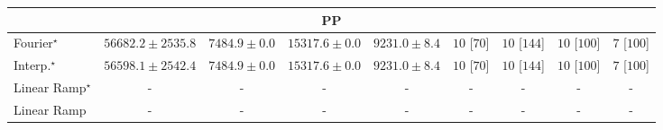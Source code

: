 \begin{tabular}{l|cccc|cccc|}
\cline{1-9}
\multicolumn{9}{c}{\rule{0pt}{8pt}PP} \\
\midrule
Fourier$^\star$ & {\cellcolor[HTML]{004529}} \color[HTML]{F1F1F1} $56682.2\pm 2535.8$ & {\cellcolor[HTML]{FEFFE1}} \color[HTML]{000000} $7484.9\pm 0.0$ & {\cellcolor[HTML]{EDF8B1}} \color[HTML]{000000} $15317.6\pm 0.0$ & {\cellcolor[HTML]{FCFED4}} \color[HTML]{000000} $9231.0\pm 8.4$ & {\cellcolor[HTML]{49006A}} \color[HTML]{F1F1F1} $10$ [$70$] & {\cellcolor[HTML]{49006A}} \color[HTML]{F1F1F1} $10$ [$144$] & {\cellcolor[HTML]{49006A}} \color[HTML]{F1F1F1} $10$ [$100$] & {\cellcolor[HTML]{CD238F}} \color[HTML]{F1F1F1} $7$ [$100$] \\
Interp.$^\star$ & {\cellcolor[HTML]{004529}} \color[HTML]{F1F1F1} $56598.1\pm 2542.4$ & {\cellcolor[HTML]{FEFFE1}} \color[HTML]{000000} $7484.9\pm 0.0$ & {\cellcolor[HTML]{EDF8B1}} \color[HTML]{000000} $15317.6\pm 0.0$ & {\cellcolor[HTML]{FCFED4}} \color[HTML]{000000} $9231.0\pm 8.4$ & {\cellcolor[HTML]{49006A}} \color[HTML]{F1F1F1} $10$ [$70$] & {\cellcolor[HTML]{49006A}} \color[HTML]{F1F1F1} $10$ [$144$] & {\cellcolor[HTML]{49006A}} \color[HTML]{F1F1F1} $10$ [$100$] & {\cellcolor[HTML]{CD238F}} \color[HTML]{F1F1F1} $7$ [$100$] \\
Linear Ramp$^\star$ & {\cellcolor[HTML]{000000}} \color[HTML]{F1F1F1} {\cellcolor{white}} \color{black} - & {\cellcolor[HTML]{000000}} \color[HTML]{F1F1F1} {\cellcolor{white}} \color{black} - & {\cellcolor[HTML]{000000}} \color[HTML]{F1F1F1} {\cellcolor{white}} \color{black} - & {\cellcolor[HTML]{000000}} \color[HTML]{F1F1F1} {\cellcolor{white}} \color{black} - & {\cellcolor[HTML]{000000}} \color[HTML]{F1F1F1} {\cellcolor{white}} \color{black} - & {\cellcolor[HTML]{000000}} \color[HTML]{F1F1F1} {\cellcolor{white}} \color{black} - & {\cellcolor[HTML]{000000}} \color[HTML]{F1F1F1} {\cellcolor{white}} \color{black} - & {\cellcolor[HTML]{000000}} \color[HTML]{F1F1F1} {\cellcolor{white}} \color{black} - \\
Linear Ramp & {\cellcolor[HTML]{000000}} \color[HTML]{F1F1F1} {\cellcolor{white}} \color{black} - & {\cellcolor[HTML]{000000}} \color[HTML]{F1F1F1} {\cellcolor{white}} \color{black} - & {\cellcolor[HTML]{000000}} \color[HTML]{F1F1F1} {\cellcolor{white}} \color{black} - & {\cellcolor[HTML]{000000}} \color[HTML]{F1F1F1} {\cellcolor{white}} \color{black} - & {\cellcolor[HTML]{000000}} \color[HTML]{F1F1F1} {\cellcolor{white}} \color{black} - & {\cellcolor[HTML]{000000}} \color[HTML]{F1F1F1} {\cellcolor{white}} \color{black} - & {\cellcolor[HTML]{000000}} \color[HTML]{F1F1F1} {\cellcolor{white}} \color{black} - & {\cellcolor[HTML]{000000}} \color[HTML]{F1F1F1} {\cellcolor{white}} \color{black} - \\

\end{tabular}
